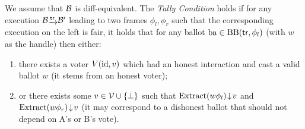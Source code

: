 \begin{condi}[Tally]
\label{condi:tally}
We assume that $\mathcal{B}$ is diff-equivalent.
The {\em Tally Condition} holds if for any execution
$\biproc\sint{\tr}\biproc'$ leading to two frames $\phi_l,\phi_r$
such that the corresponding execution on the left is fair, it holds that
for any ballot $\mathrm{ba}\in\mathrm{BB}(\mathsf{tr},\phi_l)$ (with $w$ as the handle) then either:
\begin{enumerate}
\item there exists a voter $V(\mathrm{id},v)$ which had an honest interaction and cast a valid ballot $w$
  (it stems from an honest voter);
\item or there exists some $v\in\mathcal{V}\cup\{\bot\}$ such that
  $\mathrm{Extract}(w\phi_l)\!\downarrow\! v$ and $\mathrm{Extract}(w\phi_r)\!\downarrow\! v$
  (it may correspond to a dishonest ballot that should not depend on A's or B's vote).
\end{enumerate}
\end{condi}

